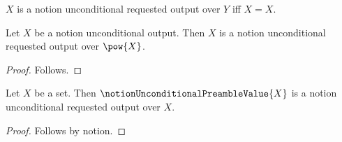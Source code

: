 

\begin{definition}\label{notion_unconditional_requested_output}
    $X$ is a notion unconditional requested output over $Y$ iff $X=X$.
\end{definition}

\begin{classification}\label{notion_unconditional_output_is_requested}
    Let $X$ be a notion unconditional output.
    Then $X$ is a notion unconditional requested output over $\pow{X}$.
\end{classification}
\begin{proof}
    Follows.
\end{proof}

\begin{proposition}\label{notion_unconditional_closure_missing}
    Let $X$ be a set.
    Then $\notionUnconditionalPreambleValue{X}$ is a notion unconditional requested output
        over $X$.
\end{proposition}
\begin{proof}
    Follows by notion.
\end{proof}
